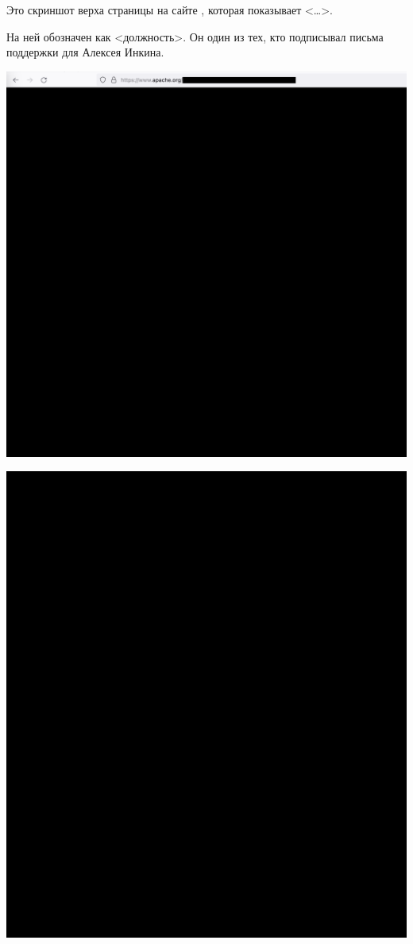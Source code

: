
Это скриншот верха страницы на сайте \Asf, которая показывает <\dots>.

На ней \MrApache обозначен как <должность>.
Он один из тех, кто подписывал письма поддержки для Алексея Инкина.

\includegraphics[width=\textwidth]{apache-roles-p1_public}
\WillContinue
\pagebreak

\Continuing
\includegraphics[width=\textwidth]{apache-roles-p2_public}
\WillContinue
\pagebreak


